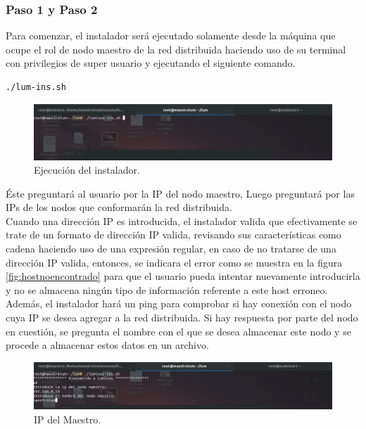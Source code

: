 \subsubsection{Paso 1 y Paso 2}
Para comenzar, el instalador será ejecutado solamente desde la máquina que ocupe el rol de nodo maestro de la red distribuida haciendo uso de su terminal con privilegios de super usuario y ejecutando el siguiente comando. 
\\
\begin{verbatim}
./lum-ins.sh
\end{verbatim}
\begin{figure}[H]
	\hypertarget{fig:ejecucion}{\hspace{1pt}}
	\begin{center}	
		\includegraphics[width=.7\textwidth]{capitulo5/images/ejecucion.png}
		\caption{Ejecución del instalador.}
		\label{fig:Ejecucion del instalador}
	\end{center}
\end{figure}
Éste preguntará al usuario por la IP del nodo maestro, Luego preguntará por las IPs de los nodos que conformarán la red distribuida. \\
Cuando una dirección IP es introducida, el instalador valida que efectivamente se trate de un formato de dirección IP valida, revisando sus características como cadena haciendo uso de una expresión regular, en caso de no tratarse de una dirección IP valida, entonces, se indicara el error como se muestra en la figura \ref{fig:hostnoencontrado} para que el usuario pueda intentar nuevamente introducirla y no se almacena ningún tipo de información referente a este host erroneo.
\\
Además, el instalador hará un ping para comprobar si hay conexión con el nodo cuya IP se desea agregar a la red distribuida. Si hay respuesta por parte del nodo en cuestión, se pregunta el nombre con el que se desea almacenar este nodo y se procede a almacenar estos datos en un archivo.
\\
\begin{figure}[H]
	\begin{center}	
		\includegraphics[width=.7\textwidth]{capitulo5/images/ipmaestro.png}
		\caption{IP del Maestro.}
		\label{fig:maestro}
	\end{center}
\end{figure}
